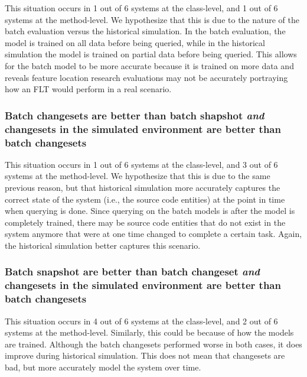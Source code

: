 %

This situation occurs in 1 out of 6 systems at the class-level, and 1 out of 6
systems at the method-level.  We hypothesize that this is due to the nature of
the batch evaluation versus the historical simulation.  In the batch evaluation,
the model is trained on all data before being queried, while in the historical
simulation the model is trained on partial data before being queried.  This
allows for the batch model to be more accurate because it is trained on more
data and reveals feature location research evaluations may not be accurately
portraying how an FLT would perform in a real scenario.

\subsubsection{Batch changesets are better than batch shapshot
\emph{and} changesets in the simulated environment are better than batch changesets}

%

This situation occurs in 1 out of 6 systems at the class-level, and 3 out of 6
systems at the method-level.  We hypothesize that this is due to the same
previous reason, but that historical simulation more accurately captures the
correct state of the system (i.e., the source code entities) at the point in
time when querying is done.  Since querying on the batch models is after the
model is completely trained, there may be source code entities that do not exist
in the system anymore that were at one time changed to complete a certain task.
Again, the historical simulation better captures this scenario.

\subsubsection{Batch snapshot are better than batch changeset
\emph{and} changesets in the simulated environment are better than batch changesets}

%

This situation occurs in 4 out of 6 systems at the class-level, and 2 out of 6
systems at the method-level.  Similarly, this could be because of how the models
are trained.  Although the batch changesets performed worse in both cases, it
does improve during historical simulation.  This does not mean that changesets
are bad, but more accurately model the system over time.

